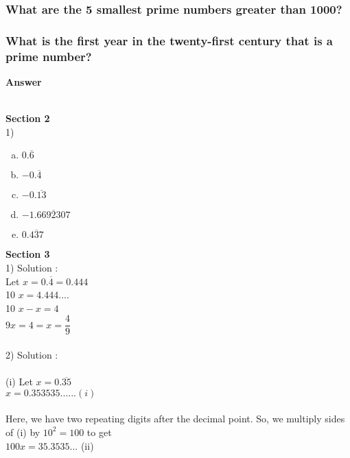 \documentclass[a4paper,10pt]{article}
\begin{document}
{\subsubsection{What are the 5 smallest prime numbers greater than 1000?}
\subsubsection{What is the first year in the twenty-first century that
is a prime number?}
\Large{\textbf{Answer}}\\\\
\large{\textbf{Section 2}\\
1)
\begin{multicols}{5}
\begin{enumerate}[a.]
\item $0.\overline{6}$
 \item $-0.\overline{4}$
 \item $-0.\overline{13}$  
 \item $-1.\overline{6692307}$ 
 \item $0.\overline{437}$ 
\end{enumerate}
\end{multicols}
 \large{\textbf{Section 3}\\
1)
Solution :\\
Let $x = 0.\overline{4} = 0.444$\\
10 $x = 4.444....$\\
10 $ x - x = 4$\\
$9x  = 4 = x = \dfrac{4}{9}$\\\\
2)  Solution :\\\\
(i) Let $x = 0.\overline{35}$\\
$x = 0.353535......(i)$\\\\
Here, we have two repeating digits after the decimal point. So, we
multiply sides of (i) by $10^2 = 100$ to get\\
$100 x = 35.3535$... (ii)\\
}}}
\end{document}
